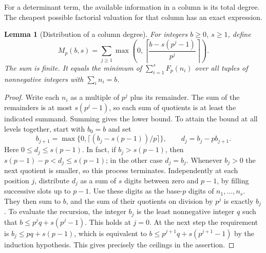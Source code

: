 \documentclass[a4paper,11pt]{article}
\newtheorem{lemma}[proposition]{Lemma}
\theoremstyle{definition}
\theoremstyle{remark}
\numberwithin{equation}{section}
\begin{document}
For a determinant term, the available information in a column is
its total degree. The cheapest possible factorial valuation for
that column has an exact expression.

\begin{lemma}[Distribution of a column degree]\label{lem:digit65}
For integers \(b\ge0\), \(s\ge1\), define
\[
    M_p(b,s)=\sum_{j\ge1}\max\!\left(0,
                  \left\lceil\frac{b-s(p^j-1)}{p^j}\right\rceil
                                 \right).
\]
The sum is finite. It equals the minimum of
\(\sum_{i=1}^{s}F_p(n_i)\) over all tuples of nonnegative
integers with \(\sum_i n_i=b\).
\end{lemma}
\begin{proof}
Write each \(n_i\) as a multiple of \(p^j\) plus its remainder.
The sum of the remainders is at most \(s(p^j-1)\), so each sum
of quotients is at least the indicated summand. Summing gives
the lower bound. To attain the bound at all levels together, start
with \(b_0=b\) and set
\[
 b_{j+1}=\max\{0,\lceil(b_j-s(p-1))/p\rceil\},\qquad
 d_j=b_j-pb_{j+1}.
\]
Here \(0\le d_j\le s(p-1)\). In fact, if \(b_j>s(p-1)\),
then \(s(p-1)-p<d_j\le s(p-1)\); in the other case
\(d_j=b_j\). Whenever \(b_j>0\) the next quotient is smaller,
so this process terminates. Independently at each position \(j\),
distribute \(d_j\) as a sum of \(s\) digits between zero and
\(p-1\), by filling successive slots up to \(p-1\).
Use these digits as the base-\(p\) digits of \(n_1,\ldots,n_s\).
They then sum to \(b\), and the sum of their quotients on division
by \(p^j\) is exactly \(b_j\). To evaluate the recursion, the
integer \(b_j\) is the least nonnegative integer \(q\) such that
\(b\le p^j q+s(p^j-1)\). This holds at \(j=0\).
At the next step the requirement is \(b_j\le p q+s(p-1)\),
which is equivalent to
\(b\le p^{j+1}q+s(p^{j+1}-1)\) by the induction hypothesis.
This gives precisely the ceilings in the assertion.
\end{proof}
\end{document}
